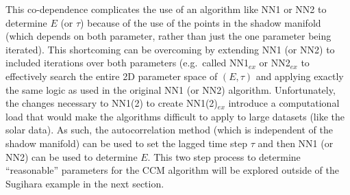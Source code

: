 \documentclass[a4paper,11pt]{article}
\begin{document}
This co-dependence complicates the use of an algorithm like NN1 or NN2 to determine $E$ (or $\tau$) because of the use of the points in the shadow manifold (which depends on both parameter, rather than just the one parameter being iterated).  This shortcoming can be overcoming by extending NN1 (or NN2) to included iterations over both parameters (e.g.\ called NN1$_{ex}$ or NN2$_{ex}$ to effectively search the entire 2D parameter space of $(E,\tau)$ and applying exactly the same logic as used in the original NN1 (or NN2) algorithm.  Unfortunately, the changes necessary to NN1(2) to create NN1(2)$_{ex}$ introduce a computational load that would make the algorithms difficult to apply to large datasets (like the solar data).  As such, the autocorrelation method (which is independent of the shadow manifold) can be used to set the lagged time step $\tau$ and then NN1 (or NN2) can be used to determine $E$.  This two step process to determine ``reasonable'' parameters for the CCM algorithm will be explored outside of the Sugihara example in the next section.
\end{document}
